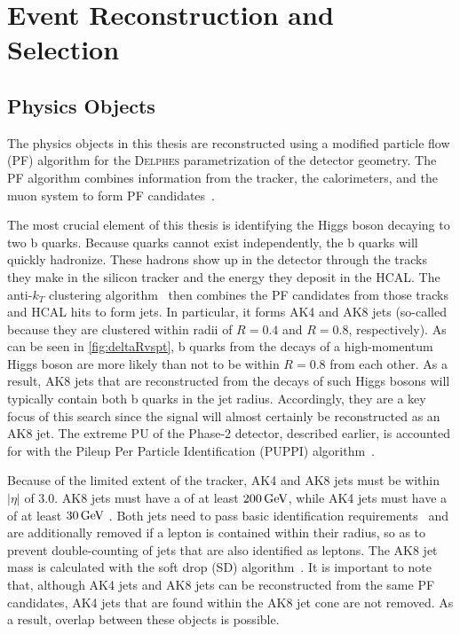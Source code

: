 \chapter{Event Reconstruction and Selection}

\section{Physics Objects}
\label{section:objects}
The physics objects in this thesis are reconstructed using a modified particle flow (PF) algorithm for the \textsc{Delphes} parametrization of the detector geometry. The PF algorithm combines information from the tracker, the calorimeters, and the muon system to form PF candidates~\cite{cms:pf2017}.

The most crucial element of this thesis is identifying the Higgs boson decaying to two b quarks. Because quarks cannot exist independently, the b quarks will quickly hadronize. These hadrons show up in the detector through the tracks they make in the silicon tracker and the energy they deposit in the HCAL. The anti-$k_T$ clustering algorithm~\cite{ak2008} then combines the PF candidates from those tracks and HCAL hits to form jets. In particular, it forms AK4 and AK8 jets (so-called because they are clustered within radii of $R=0.4$ and $R=0.8$, respectively). As can be seen in \cref{fig:deltaRvspt}, b quarks from the decays of a high-momentum Higgs boson are more likely than not to be within $R=0.8$ from each other. As a result, AK8 jets that are reconstructed from the decays of such Higgs bosons will typically contain both b quarks in the jet radius. Accordingly, they are a key focus of this search since the signal will almost certainly be reconstructed as an AK8 jet. The extreme PU of the Phase-2 detector, described earlier, is accounted for with the Pileup Per Particle Identification (PUPPI) algorithm~\cite{puppi2014}.

Because of the limited extent of the tracker, AK4 and AK8 jets must be within $|\eta|$ of $3.0$. AK8 jets must have a \pt of at least $\GeV{200}$, while AK4 jets must have a \pt of at least $\GeV{30}$ . Both jets need to pass basic identification requirements~\cite{CMS-DP-2020-020} and are additionally removed if a lepton is contained within their radius, so as to prevent double-counting of jets that are also identified as leptons. The AK8 jet mass is calculated with the soft drop (SD) algorithm~\cite{sd2014}. It is important to note that, although AK4 jets and AK8 jets can be reconstructed from the same PF candidates, AK4 jets that are found within the AK8 jet cone are not removed. As a result, overlap between these objects is possible.


